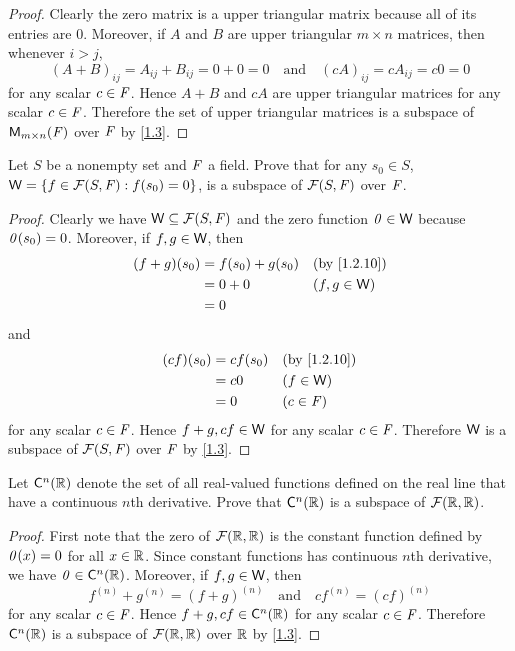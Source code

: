 \begin{proof}
  Clearly the zero matrix is a upper triangular matrix because all of its entries are \(0\).
  Moreover, if \(A\) and \(B\) are upper triangular \(m \times n\) matrices, then whenever \(i > j\),
  \[
    (A + B)_{i j} = A_{i j} + B_{i j} = 0 + 0 = 0 \quad \text{and} \quad (cA)_{i j} = cA_{i j} = c0 = 0
  \]
  for any scalar \(c \in \mathit{F}\).
  Hence \(A + B\) and \(cA\) are upper triangular matrices for any scalar \(c \in \mathit{F}\).
  Therefore the set of upper triangular matrices is a subspace of \(\mathsf{M}_{{m} \times n}({\mathit{F}})\) over \(\mathit{F}\) by \cref{1.3}.
\end{proof}

\begin{ex}\label{ex:1.3.13}
  Let \(S\) be a nonempty set and \(\mathit{F}\) a field.
  Prove that for any \(s_0 \in S\), \(\W = \set{f \in \FS : f(s_0) = 0}\), is a subspace of \(\FS\) over \(\mathit{F}\).
\end{ex}

\begin{proof}
  Clearly we have \(\W \subseteq \FS\) and the zero function \(\mathit{0} \in \mathsf{W}\) because \(\mathit{0}(s_0) = 0\).
  Moreover, if \(f, g \in \mathsf{W}\), then
  \begin{align*}
    (f + g)(s_0) & = f(s_0) + g(s_0) &  & \text{(by \cref{1.2.10})} \\
                 & = 0 + 0           &  & (f, g \in \W)             \\
                 & = 0
  \end{align*}
  and
  \begin{align*}
    (cf)(s_0) & = cf(s_0) &  & \text{(by \cref{1.2.10})} \\
              & = c0      &  & (f \in \W)                \\
              & = 0       &  & (c \in \F)
  \end{align*}
  for any scalar \(c \in \mathit{F}\).
  Hence \(f + g, cf \in \mathsf{W}\) for any scalar \(c \in \mathit{F}\).
  Therefore \(\mathsf{W}\) is a subspace of \(\FS\) over \(\mathit{F}\) by \cref{1.3}.
\end{proof}

\setcounter{ex}{15}
\begin{ex}\label{ex:1.3.16}
  Let \(\cfs[n]{\R}\) denote the set of all real-valued functions defined on the real line that have a continuous \(n\)th derivative.
  Prove that \(\cfs[n]{\R}\) is a subspace of \(\fs{\R}{\R}\).
\end{ex}

\begin{proof}
  First note that the zero of \(\fs{\R}{\R}\) is the constant function defined by \(\mathit{0}(x) = 0\) for all \(x \in \mathbb{R}\).
  Since constant functions has continuous \(n\)th derivative, we have \(\zv \in \cfs[n]{\R}\).
  Moreover, if \(f, g \in \mathsf{W}\), then
  \[
    f^{(n)} + g^{(n)} = (f + g)^{(n)} \quad \text{and} \quad cf^{(n)} = (cf)^{(n)}
  \]
  for any scalar \(c \in \mathit{F}\).
  Hence \(f + g, cf \in \cfs[n]{\R}\) for any scalar \(c \in \mathit{F}\).
  Therefore \(\cfs[n]{\R}\) is a subspace of \(\fs{\R}{\R}\) over \(\mathbb{R}\) by \cref{1.3}.
\end{proof}

